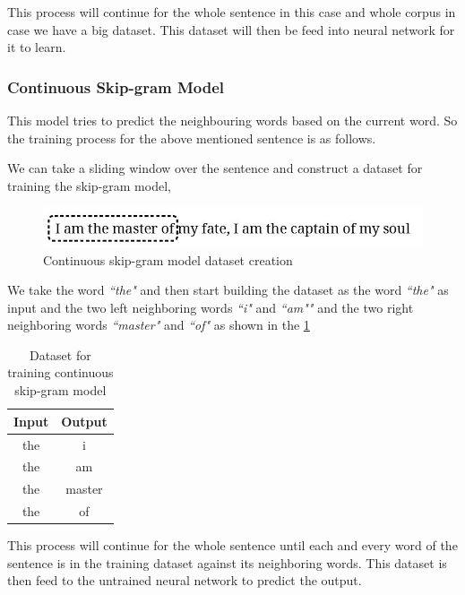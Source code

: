This process will continue for the whole sentence in this case and whole corpus in case we have a big dataset. This dataset will then be feed into neural network for it to learn. 

\subsubsection*{Continuous Skip-gram Model}
This model tries to predict the neighbouring words based on the current word. So the training process for the above mentioned sentence is as follows.

We can take a sliding window over the sentence and construct a dataset for training the skip-gram model, 
\begin{figure}[!ht]
    \centering
    \includegraphics[width=12cm]{pics/skipgramWord2vec.jpg}
    \caption{Continuous skip-gram model dataset creation}
    \label{fig:skipgramWord2vec}
\end{figure}

We take the word \textit{``the"} and then start building the dataset as the word \textit{``the"} as input and the two left neighboring words \textit{``i"} and \textit{``am""} and the two right neighboring words \textit{``master"} and \textit{``of"} as shown in the \ref{fig:skipgramWord2vec}

\begin{table}[!ht]
\centering
\begin{tabular}{cc}
\hline
\textbf{Input} & \textbf{Output} \\ \hline
the            & i               \\ \hline
the            & am              \\ \hline
the            & master          \\ \hline
the            & of              \\ \hline
\end{tabular}
\caption{Dataset for training continuous skip-gram model}
\label{word2vec-skipgram-dataset}
\end{table}

This process will continue for the whole sentence until each and every word of the sentence is in the training dataset against its neighboring words. This dataset is then feed to the untrained neural network to predict the output.  

